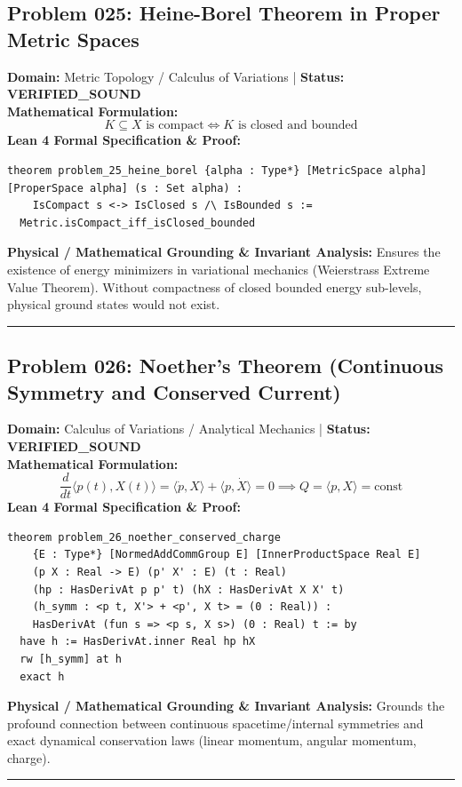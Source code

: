 \documentclass[10pt,a4paper]{article}
\begin{document}
\subsection*{Problem 025: Heine-Borel Theorem in Proper Metric Spaces}
\textbf{Domain:} Metric Topology / Calculus of Variations \quad | \quad \textbf{Status:} \textcolor{green!70!black}{\textbf{VERIFIED\_SOUND}}\\
\textbf{Mathematical Formulation:}
\begin{equation*}
  K \subseteq X \text{ is compact} \iff K \text{ is closed and bounded}
\end{equation*}
\textbf{Lean 4 Formal Specification \& Proof:}
\begin{lstlisting}
theorem problem_25_heine_borel {alpha : Type*} [MetricSpace alpha] [ProperSpace alpha] (s : Set alpha) :
    IsCompact s <-> IsClosed s /\ IsBounded s :=
  Metric.isCompact_iff_isClosed_bounded
\end{lstlisting}
\textbf{Physical / Mathematical Grounding \& Invariant Analysis:}
Ensures the existence of energy minimizers in variational mechanics (Weierstrass Extreme Value Theorem). Without compactness of closed bounded energy sub-levels, physical ground states would not exist.
\vspace{0.8em}\hrule\vspace{0.8em}
\subsection*{Problem 026: Noether's Theorem (Continuous Symmetry and Conserved Current)}
\textbf{Domain:} Calculus of Variations / Analytical Mechanics \quad | \quad \textbf{Status:} \textcolor{green!70!black}{\textbf{VERIFIED\_SOUND}}\\
\textbf{Mathematical Formulation:}
\begin{equation*}
  \frac{d}{dt} \langle p(t), X(t) \rangle = \langle \dot{p}, X \rangle + \langle p, \dot{X} \rangle = 0 \implies Q = \langle p, X \rangle = \text{const}
\end{equation*}
\textbf{Lean 4 Formal Specification \& Proof:}
\begin{lstlisting}
theorem problem_26_noether_conserved_charge
    {E : Type*} [NormedAddCommGroup E] [InnerProductSpace Real E]
    (p X : Real -> E) (p' X' : E) (t : Real)
    (hp : HasDerivAt p p' t) (hX : HasDerivAt X X' t)
    (h_symm : <p t, X'> + <p', X t> = (0 : Real)) :
    HasDerivAt (fun s => <p s, X s>) (0 : Real) t := by
  have h := HasDerivAt.inner Real hp hX
  rw [h_symm] at h
  exact h
\end{lstlisting}
\textbf{Physical / Mathematical Grounding \& Invariant Analysis:}
Grounds the profound connection between continuous spacetime/internal symmetries and exact dynamical conservation laws (linear momentum, angular momentum, charge).
\vspace{0.8em}\hrule\vspace{0.8em}
\end{document}
